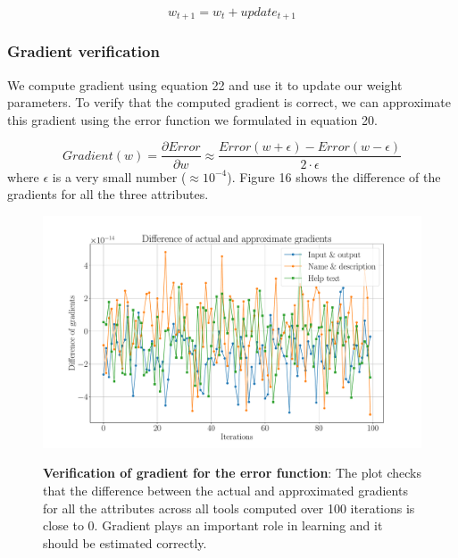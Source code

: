 \begin{equation}
w_{t+1} = w_t + update_{t+1}
\end{equation}

\subsubsection{Gradient verification}
We compute gradient using equation 22 and use it to update our weight parameters. To verify that the computed gradient is correct, we can approximate this gradient using the error function we formulated in equation 20.

\begin{equation}
Gradient(w) = \frac{\partial Error}{\partial w} \approx \frac{Error(w + \epsilon) - Error(w - \epsilon)}{2 \cdot \epsilon} 
\end{equation}
where $\epsilon$ is a very small number ($\approx10^{-4}$). Figure 16 shows the difference of the gradients for all the three attributes.

\begin{figure}[h]
\begin{centering}
    {\includegraphics[scale=0.35]{figures/Difference_gradients.pdf}}
    \caption[Verification of gradient for the error function]{\textbf{Verification of gradient for the error function}: The plot checks that the difference between the actual and approximated gradients for all the attributes across all tools computed over 100 iterations is close to 0. Gradient plays an important role in learning and it should be estimated correctly. }
\end{centering}
\end{figure}
